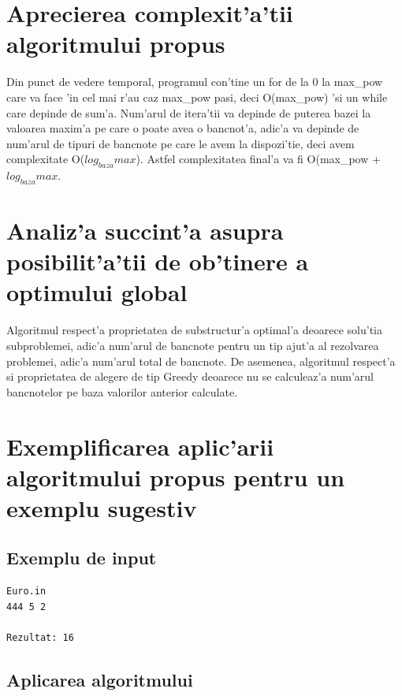 \vspace{10mm}
\section{Aprecierea complexit'a'tii algoritmului propus}
\myindent
Din punct de vedere temporal, programul con'tine un for de la 0 la max\_pow care va face 'in cel mai r'au caz max\_pow pasi, deci O(max\_pow) 'si un while care depinde de sum'a. Num'arul de itera'tii va depinde de puterea bazei la valoarea maxim'a pe care o poate avea o bancnot'a, adic'a va depinde de num'arul de tipuri de bancnote pe care le avem la dispozi'tie, deci avem complexitate O($log_{baza}max$). Astfel complexitatea final'a va fi O(max\_pow + $log_{baza}max$.

\section{Analiz'a succint'a asupra posibilit'a'tii de ob'tinere a optimului global}
\myindent
Algoritmul respect'a proprietatea de substructur'a optimal'a deoarece solu'tia subproblemei, adic'a num'arul de bancnote pentru un tip ajut'a al rezolvarea problemei, adic'a num'arul total de bancnote. De asemenea, algoritmul respect'a si proprietatea de alegere de tip Greedy deoarece nu se calculeaz'a num'arul bancnotelor pe baza valorilor anterior calculate.

\section{Exemplificarea aplic'arii algoritmului propus pentru un exemplu sugestiv}
\subsection{Exemplu de input}
\begin{verbatim}
Euro.in
444 5 2

Rezultat: 16
\end{verbatim}

\subsection{Aplicarea algoritmului}

